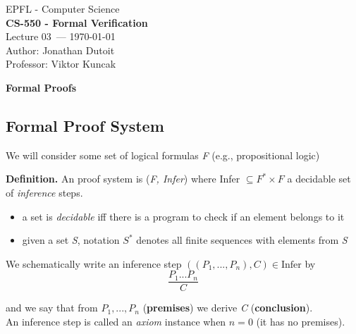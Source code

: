 \documentclass[11pt]{article}
\newcommand{\coursename}{CS-550 - Formal Verification}
\newcommand{\lecturenum}{03}
\newcommand{\lecturedate}{\today}
\newcommand{\professor}{Viktor Kuncak}
\begin{document}
\begin{center}
  {\large EPFL - Computer Science} \\[0.5em]
  {\Large \textbf{\coursename}} \\[0.5em]
  {\large Lecture \lecturenum\ --- \lecturedate} \\[0.5em]
  {\large Author: Jonathan Dutoit} \\[0.5em]
  {\large Professor: \professor} \\[0.5em]
\end{center}

\vspace{0.5cm}

\begin{center}
  {\LARGE \textbf{Formal Proofs}}
\end{center}

\vspace{0.5cm}

\subsection*{Formal Proof System}

We will consider some set of logical formulas \textit{F} (e.g., propositional logic)

\begin{tcolorbox}[
    enhanced,
    frame hidden,
    borderline west={2pt}{0pt}{black},
    boxsep=5pt,
    left=8pt
]
\textbf{Definition.} An proof system is (\textit{F, Infer}) where Infer $\subseteq F^{*} \times F$ a decidable set of \textit{inference} steps. 
\begin{itemize}
	\item a set is \textit{decidable} iff there is a program to check if an element belongs to it
	\item given a set \textit{S}, notation $S^{*}$ denotes all finite sequences with elements from \textit{S} \\
\end{itemize}

We schematically write an inference step $((P_1, ..., P_n), C) \in \text{Infer}$ by $$\frac{P_1 ... P_n}{C}$$ 

and we say that from $P_1, ..., P_n$ (\textbf{premises}) we derive \textit{C} (\textbf{conclusion}). \\

An inference step is called an \textit{axiom} instance when $n = 0$ (it has no premises). 

\end{tcolorbox}
\end{document}
